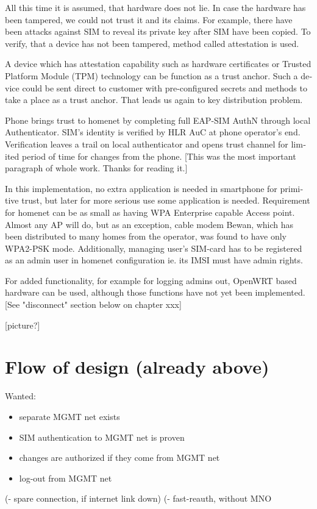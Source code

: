 \documentclass[12pt,a4paper,english]{tutthesis}
\begin{document}
\begin{otherlanguage}{english}
All this time it is assumed, that hardware does not lie. In case
the hardware has been tampered, we could not trust it and its claims.
For example, there have been attacks against SIM to reveal its private
key after SIM have been copied.  To verify, that a device has not been
tampered, method called attestation is used.

A device which has attestation capability such as 
hardware certificates or Trusted Platform Module (TPM) technology
can be function as a trust anchor.
Such a device could be sent direct to customer with pre-configured
secrets and methods to take a place as a trust anchor. 
That leads us again to key distribution problem.






Phone brings trust to homenet by completing full EAP-SIM AuthN through
local Authenticator. SIM's identity is verified by HLR AuC at phone
operator's end. Verification leaves a trail on local authenticator and
opens trust channel for limited period of time for changes from the phone.
[This was the most important paragraph of whole work. Thanks for
reading it.]





In this implementation, no extra application is needed in smartphone
for primitive trust, but later for more serious use some application is needed.
Requirement for homenet can be as small as having WPA Enterprise capable
Access point. Almost any AP will  do, but as an exception, cable modem Bewan, which 
has been distributed to many homes from the operator, was found to have only WPA2-PSK mode.
Additionally, managing user's SIM-card has to be registered as an admin user in homenet 
configuration ie. its IMSI must have admin rights.


 For added functionality, for example for
logging admins out, OpenWRT based hardware can be used, although those functions have
not yet been implemented. 
[See "disconnect" section below on chapter xxx]

[picture?]

\section{Flow of design (already above)}
\label{sec-4-2}

Wanted: 
\begin{itemize}
\item separate MGMT net exists
\item SIM authentication to MGMT net is proven
\item changes are authorized if they come from MGMT net
\item log-out from MGMT net
\end{itemize}
(- spare connection, if internet link down)
(- fast-reauth, without MNO


\end{otherlanguage}
\end{document}
